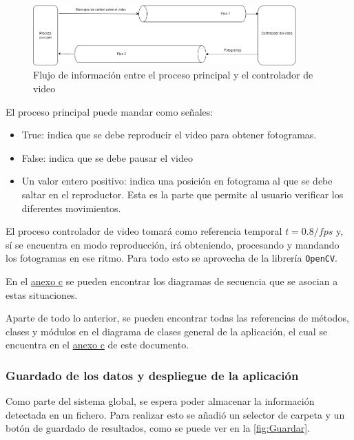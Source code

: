 \begin{enumerate}
    \begin{figure}[H]
        \centering
        \includegraphics[width=0.9\textwidth]{images/6/6.5/Procesos2.png}
        \caption{Flujo de información entre el proceso principal y el controlador de video}
        \label{fig:DatosVideo}
    \end{figure}

    El proceso principal puede mandar como señales:
    \begin{itemize}
        \item True: indica que se debe reproducir el video para obtener fotogramas.
        \item False: indica que se debe pausar el video
        \item Un valor entero positivo: indica una posición en fotograma al que se debe saltar en el reproductor. Esta es la parte que permite al usuario verificar los diferentes movimientos.
    \end{itemize}
    El proceso controlador de video tomará como referencia temporal $ t = 0.8/fps $ y, sí se encuentra en modo reproducción, irá obteniendo, procesando y mandando los fotogramas en ese ritmo. Para todo 
    esto se aprovecha de la librería \texttt{OpenCV}.
    
    En el \hyperref[esquema:SecuenciaResto]{anexo c} se pueden encontrar los diagramas de secuencia que se asocian a estas situaciones.
\end{enumerate}

\vspace{2\baselineskip}

Aparte de todo lo anterior, se pueden encontrar todas las referencias de métodos, clases y módulos en el diagrama de clases general de la aplicación, el cual se encuentra en el 
\hyperref[esquema:DiagramaClases]{anexo c} de este documento.

\clearpage
\subsubsection{Guardado de los datos y despliegue de la aplicación}

Como parte del sistema global, se espera poder almacenar la información detectada en un fichero. Para realizar esto se añadió un selector de carpeta y un botón de guardado de resultados, como se puede 
ver en la \autoref{fig:Guardar}.

